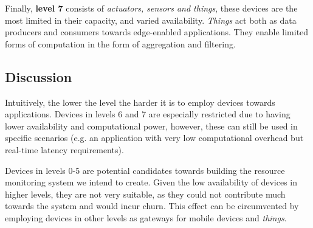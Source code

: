 Finally, \textbf{level 7} consists of \textit{actuators, sensors and things}, these devices are the most limited in their capacity, and varied availability. \textit{Things} act both as data producers and consumers towards edge-enabled applications. They enable limited forms of computation in the form of aggregation and filtering.

\subsection{Discussion}

Intuitively, the lower the level the harder it is to employ devices towards applications. Devices in levels 6 and 7 are especially restricted due to having lower availability and computational power, however, these can still be used in specific scenarios (e.g. an application with very low computational overhead but real-time latency requirements). 

Devices in levels 0-5 are potential candidates towards building the resource monitoring system we intend to create. Given the low availability of devices in higher levels, they are not very suitable, as they could not contribute much towards the system and would incur churn. This effect can be circumvented by employing devices in other levels as gateways for mobile devices and \textit{things}.
